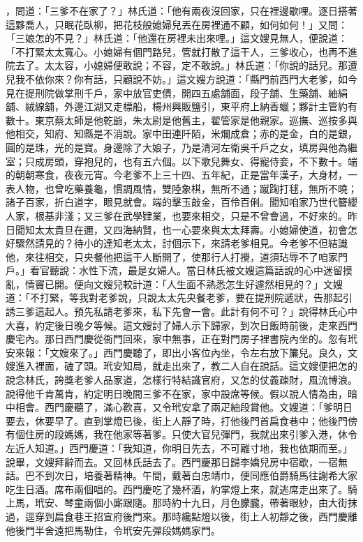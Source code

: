 ，問道：「三爹不在家了？」林氏道：「他有兩夜沒回家，只在裡邊歇哩。逐日搭著這夥喬人，只眠花臥柳，把花枝般媳婦兒丟在房裡通不顧，如何如何！」又問：「三娘怎的不見？」林氏道：「他還在房裡未出來哩。」這文嫂見無人，便說道：「不打緊太太寬心。小媳婦有個門路兒，管就打散了這干人，三爹收心，也再不進院去了。太太容，小媳婦便敢說；不容，定不敢說。」林氏道：「你說的話兒。那遭兒我不依你來？你有話，只顧說不妨。」這文嫂方說道：「縣門前西門大老爹，如今見在提刑院做掌刑千戶，家中放官吏債，開四五處舖面，段子舖、生藥舖、紬絹舖、絨線舖，外邊江湖又走標船，楊州興販鹽引，東平府上納香蠟；夥計主管約有數十。東京蔡太師是他乾爺，朱太尉是他舊主，翟管家是他親家。巡撫、巡按多與他相交，知府、知縣是不消說。家中田連阡陌，米爛成倉；赤的是金，白的是銀，圓的是珠，光的是寶。身邊除了大娘子，乃是清河左衛吳千戶之女，填房與他為繼室；只成房頭，穿袍兒的，也有五六個。以下歌兒舞女、得寵侍妾，不下數十。端的朝朝寒食，夜夜元宵。今老爹不上三十四、五年紀，正是當年漢子，大身材，一表人物，也曾吃藥養龜，慣調風情，雙陸象棋，無所不通；蹴踘打毬，無所不曉；諸子百家，折白道字，眼見就會。端的擊玉敲金，百伶百俐。聞知咱家乃世代簪纓人家，根基非淺；又三爹在武學肄業，也要來相交，只是不曾會過，不好來的。昨日聞知太太貴旦在邇，又四海納賢，也一心要來與太太拜壽。小媳婦使道，初會怎好驟然請見的？待小的達知老太太，討個示下，來請老爹相見。今老爹不但結識他，來往相交，只央餐他把這干人斷開了，使那行人打攪，道須玷辱不了咱家門戶。」看官聽說：水性下流，最是女婦人。當日林氏被文嫂這篇話說的心中迷留摸亂，情竇已開。便向文嫂兒較計道：「人生面不熟悉怎生好遽然相見的？」文嫂道：「不打緊，等我對老爹說，只說太太先央餐老爹，要在提刑院遞狀，告那起引誘三爹這起人。預先私請老爹來，私下先會一會。此計有何不可？」說得林氏心中大喜，約定後日晚夕等候。這文嫂討了婦人示下歸家，到次日飯時前後，走來西門慶宅內。那日西門慶從衙門回來，家中無事，正在對門房子裡書院內坐的。忽有玳安來報：「文嫂來了。」西門慶聽了，即出小客位內坐，令左右放下簾兒。良久，文嫂進入裡面，磕了頭。玳安知局，就走出來了，教二人自在說話。這文嫂便把怎的說念林氏，誇獎老爹人品家道，怎樣行特結識官府，又怎的仗義疎財，風流博浪。說得他千肯萬肯，約定明日晚間三爹不在家，家中設席等候。假以說人情為由，暗中相會。西門慶聽了，滿心歡喜，又令玳安拿了兩疋紬段賞他。文嫂道：「爹明日要去，休要早了。直到掌燈已後，街上人靜了時，打他後門首扁食巷中；他後門傍有個住房的段媽媽，我在他家等著爹。只使大官兒彈門，我就出來引爹入港，休令左近人知道。」西門慶道：「我知道，你明日先去，不可離寸地，我也依期而至。」說畢，文嫂拜辭而去。又回林氏話去了。西門慶那日歸李嬌兒房中宿歇，一宿無話。巴不到次日，培養著精神。午間，戴著白忠靖巾，便同應伯爵騎馬往謝希大家吃生日酒。席布兩個唱的。西門慶吃了幾杯酒，約掌燈上來，就逃席走出來了。騎上馬，玳安、琴童兩個小廝跟隨。那時約十九日，月色朦朧，帶著眼紗，由大街抹過，逕穿到扁食巷王招宣府後門來。那時纔點燈以後，街上人初靜之後，西門慶離他後門半舍遠把馬勒住，令玳安先彈段媽媽家門。

